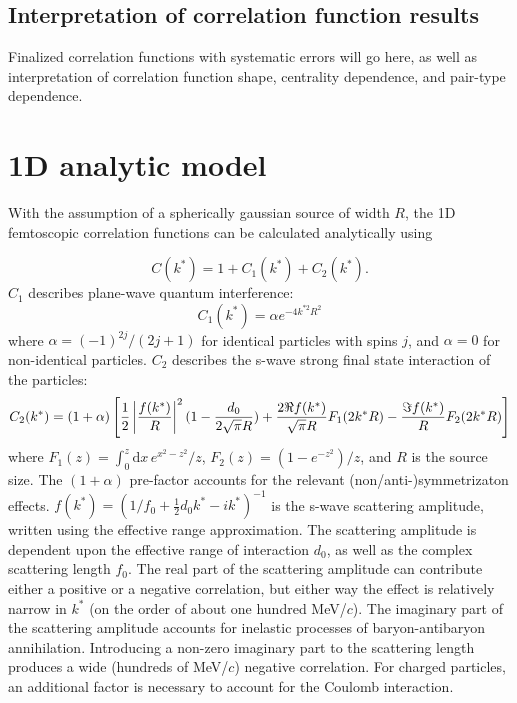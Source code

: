 \subsection{Interpretation of correlation function results}
\label{sec:CFInterpretation}

Finalized correlation functions with systematic errors will go here, as well as interpretation of correlation function shape, centrality dependence, and pair-type dependence.  

\section{1D analytic model}
\label{sec:AnalyticModel}
With the assumption of a spherically gaussian source of width $R$, the 1D femtoscopic correlation functions can be calculated analytically \cite{lednicky82} using 

\begin{equation}
C(k^*)= 1 + C_1(k^*)+C_2(k^*).
\end{equation}
$C_1$ describes plane-wave quantum interference:
\begin{equation}
C_1(k^*) = \alpha e^{-4k^{*2}R^2}
\end{equation}
where $\alpha = (-1)^{2j}/(2j+1)$ for identical particles with spins $j$, and $\alpha = 0$ for non-identical particles.  $C_2$ describes the s-wave strong final state interaction of the particles:
\begin{equation}
\label{eq:Lednicky}
C_2(k^*)= (1+\alpha)\left[\frac{1}{2}\left\lvert\frac{f(k^*)}{R}\right\rvert^2(1-\frac{d_0}{2\sqrt{\pi}R})+\frac{2\Re f(k^*)}{\sqrt{\pi}R}F_1(2k^*R)-\frac{\Im f(k^*)}{R}F_2(2k^*R)\right]
\end{equation}
where $F_1(z) = \int_0^z \! \mathrm{d}x \, e^{x^2-z^2}/z$,  $F_2(z) = (1-e^{-z^2})/z$, and $R$ is the source size. The $(1+\alpha)$ pre-factor accounts for the relevant (non/anti-)symmetrizaton effects.  $f(k^*)=(1/f_0+\frac{1}{2}d_0k^*-ik^*)^{-1}$ is the s-wave scattering amplitude, written using the effective range approximation.  The scattering amplitude is dependent upon the effective range of interaction $d_0$, as well as the complex scattering length $f_0$.  The real part of the scattering amplitude can contribute either a positive or a negative correlation, but either way the effect is relatively narrow in $k^*$ (on the order of about one hundred MeV/$c$).  The imaginary part of the scattering amplitude accounts for inelastic processes of baryon-antibaryon annihilation.  Introducing a non-zero imaginary part to the scattering length produces a wide (hundreds of MeV/$c$) negative correlation.  For charged particles, an additional factor \cite{Aamodt:2011kd} is necessary to account for the Coulomb interaction.

